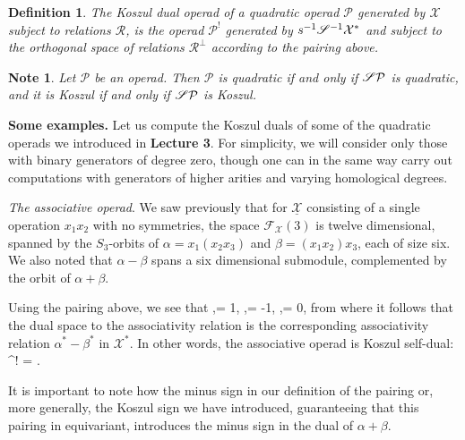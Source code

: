 \documentclass[fleqn,a4paper, twoside]{article}
\makeatletter
\newcommand{\0}{\langle 0\rangle}
\newcommand{\XX}{\mathcal{X}}
\newcommand{\RR}{\mathcal{R}}
\newcommand{\FF}{\mathcal{F}}
\let\[\@undefined
\DeclareRobustCommand{\[}{\begin{equation}}%
\let\]\@undefined
\DeclareRobustCommand{\]}{\end{equation}}%
\theoremstyle{mytheorem}
\theoremstyle{introthm}
\theoremstyle{mydefinition}
\newtheorem{definition}[theorem]{Definition}
\newtheorem{note}[theorem]{Note}
\theoremstyle{mydefinition2}
\theoremstyle{plain} %
\newcommand{\?}{\,?\,}
\newcommand{\PP}{{\mathcal{P}}}
\theoremstyle{mytheorem}
\theoremstyle{plain} %
\makeatother
\begin{document}
\begin{definition}
The Koszul dual operad of a quadratic operad $\PP$ 
generated by $\XX$ subject to relations $\RR$, is
the operad $\PP^!$ generated by $s^{-1}\sus^{-1}\XX^*$ 
and subject to the orthogonal space of relations
$\RR^\perp$ according to the pairing above.
\end{definition} 

\begin{note}
Let $\PP$ be an operad. Then $\PP$ is quadratic if and
only if $\sus\PP$ is quadratic, and it is Koszul if and
only if $\sus\PP$ is Koszul. 
\end{note}

\textbf{Some examples.} Let us compute the Koszul duals of 
some of the quadratic operads we introduced in \textbf{Lecture 3}.
For simplicity, we will consider only those with binary 
generators of degree zero, though one can in the same way
carry out computations with generators of higher arities and
varying homological degrees.

\bigskip

\emph{The associative operad}. We saw previously that for
$\underline{\XX}$ consisting of a single operation
$x_1x_2$ with no symmetries, the
space $\FF_\XX(3)$ is twelve dimensional, spanned by
the $S_3$-orbits of $\alpha = x_1(x_2x_3)$ and $\beta =(x_1x_2)x_3$,
each of size six. We also noted that $\alpha-\beta$
spans a six dimensional submodule, complemented by the
orbit of $\alpha+\beta$. 

Using the pairing above, we see that
\[\langle \alpha,\alpha\rangle = 1,
	\quad \langle\beta,\beta\rangle = -1,
	\quad \langle \alpha,\beta\rangle = 0, \] 
from where it follows that the dual space to the associativity
relation is the corresponding associativity relation
$\alpha^* - \beta^*$ in $\XX^*$. In other words,
the associative operad is Koszul self-dual:
\[^! = .\]

It is important to note how the minus sign in our
definition of the pairing or, more generally, the
Koszul sign we have introduced, guaranteeing that
this pairing in equivariant, introduces the minus sign
in the dual of $\alpha+\beta$.

\bigskip
\end{document}
